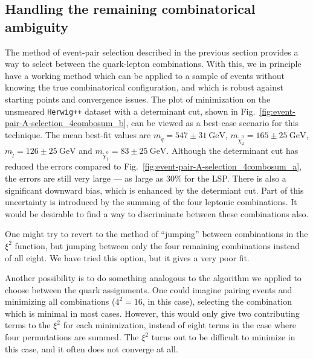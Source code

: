\documentclass[twoside,english]{uiofysmaster}
\begin{document}
\subsection{Handling the remaining combinatorical ambiguity}
The method of event-pair selection described in the previous section provides a way to select between the quark-lepton combinations. With this, we in principle have a working method which can be applied to a sample of events without knowing the true combinatorical configuration, and which is robust against starting points and convergence issues. The plot of minimization on the unsmeared {\tt Herwig++} dataset with a determinant cut, shown in Fig.\ \ref{fig:event-pair-A-selection_4combosum_b}, can be viewed as a best-case scenario for this technique. The mean best-fit values are $m_{\tilde q} = 547 \pm 31 ~\mathrm{GeV}$, $m_{\tilde \chi_2^0} = 165\pm 25 ~\mathrm{GeV}$, $m_{\tilde l} = 126 \pm 25 ~\mathrm{GeV}$ and $m_{\tilde \chi_1^0} = 83 \pm 25 ~\mathrm{GeV}$. Although the determinant cut has reduced the errors compared to Fig.\ \ref{fig:event-pair-A-selection_4combosum_a}, the errors are still very large --- as large as 30\% for the LSP. There is also a significant downward bias, which is enhanced by the determiant cut. Part of this uncertainty is introduced by the summing of the four leptonic combinations. It would be desirable to find a way to discriminate between these combinations also. 

One might try to revert to the method of ``jumping'' between combinations in the $\xi^2$ function, but jumping between only the four remaining combinations instead of all eight. We have tried this option, but it gives a very poor fit. 

Another possibility is to do something analogous to the algorithm we applied to choose between the quark assignments. One could imagine pairing events and minimizing all combinations ($4^2 = 16$, in this case), selecting the combination which is minimal in most cases. However, this would only give two contributing terms to the $\xi^2$ for each minimization, instead of eight terms in the case where four permutations are summed. The $\xi^2$ turns out to be difficult to minimize in this case, and it often does not converge at all.
\end{document}

